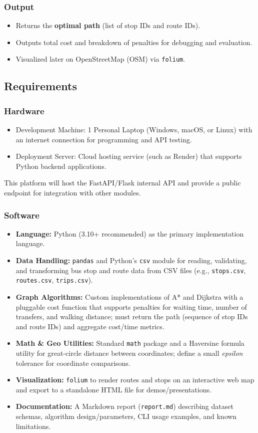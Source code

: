 \subsubsection{Output}
\begin{itemize}
  \item Returns the \textbf{optimal path} (list of stop IDs and route IDs).
  \item Outputs total cost and breakdown of penalties for debugging and evaluation.
  \item Visualized later on OpenStreetMap (OSM) via \texttt{folium}.
\end{itemize}

\subsection{Requirements}
\subsubsection{Hardware}
\begin{itemize}
    \item Development Machine: 1 Personal Laptop (Windows, macOS, or Linux) with an internet connection for programming and API testing.
    \item Deployment Server: Cloud hosting service (such as Render) that supports Python backend applications.
\end{itemize}
This platform will host the FastAPI/Flask internal API and provide a public endpoint for integration with other modules.

\subsubsection{Software}
\begin{itemize}
  \item \textbf{Language:} Python (3.10+ recommended) as the primary implementation language.
  \item \textbf{Data Handling:} \texttt{pandas} and Python's \texttt{csv} module for reading, validating, and transforming bus stop and route data from CSV files (e.g., \texttt{stops.csv}, \texttt{routes.csv}, \texttt{trips.csv}).
  \item \textbf{Graph Algorithms:} Custom implementations of A* and Dijkstra with a pluggable cost function that supports penalties for waiting time, number of transfers, and walking distance; must return the path (sequence of stop IDs and route IDs) and aggregate cost/time metrics.
  \item \textbf{Math \& Geo Utilities:} Standard \texttt{math} package and a Haversine formula utility for great-circle distance between coordinates; define a small \emph{epsilon} tolerance for coordinate comparisons.
  \item \textbf{Visualization:} \texttt{folium} to render routes and stops on an interactive web map and export to a standalone HTML file for demos/presentations.
  \item \textbf{Documentation:} A Markdown report (\texttt{report.md}) describing dataset schemas, algorithm design/parameters, CLI usage examples, and known limitations.
\end{itemize}

